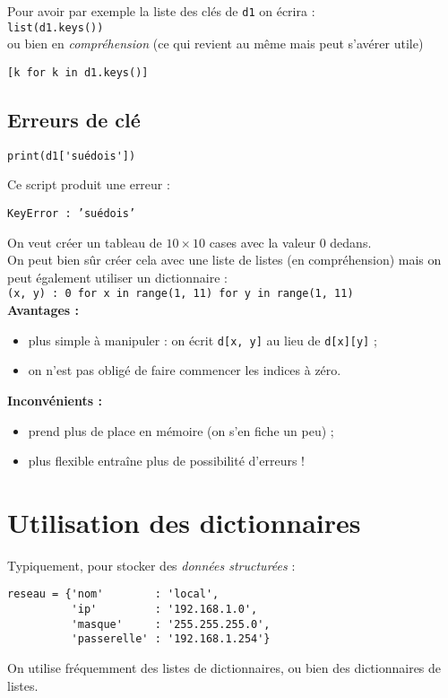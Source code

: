 Pour avoir par exemple la liste des clés de \texttt{d1} on écrira :\\

\texttt{list(d1.keys())}\\

ou bien en \textit{compréhension} (ce qui revient au même mais peut s'avérer utile)

\texttt{[k for k in d1.keys()]}

\subsection{Erreurs de clé}
\begin{verbatim}
print(d1['suédois'])
\end{verbatim}

Ce script produit une erreur :

{\color{red}\texttt{KeyError : 'suédois'}}

\begin{exemple}
    On veut créer un tableau de $10\times 10$ cases avec la valeur 0 dedans.\\

    On peut bien sûr créer cela avec une liste de listes (en compréhension) mais on peut également utiliser un dictionnaire :\\

    \texttt{{(x, y) : 0 for x in range(1, 11) for y in range(1, 11)}}\\

    \textbf{Avantages :}
    \begin{itemize}
        \item 	plus simple à manipuler : on écrit \texttt{d[x, y]} au lieu de \texttt{d[x][y]} ;
        \item 	on n'est pas obligé de faire commencer les indices à zéro.
    \end{itemize}

    \textbf{Inconvénients :}
    \begin{itemize}
        \item prend plus de place en mémoire (on s'en fiche un peu) ;
        \item plus flexible entraîne plus de possibilité d'erreurs !
    \end{itemize}
\end{exemple}


\section{Utilisation des dictionnaires}


Typiquement, pour stocker des \textit{données structurées} :    \\
\begin{verbatim}
reseau = {'nom'        : 'local',
          'ip'         : '192.168.1.0',
          'masque'     : '255.255.255.0',
          'passerelle' : '192.168.1.254'}
\end{verbatim}

On utilise fréquemment des listes de dictionnaires, ou bien des dictionnaires de listes.
